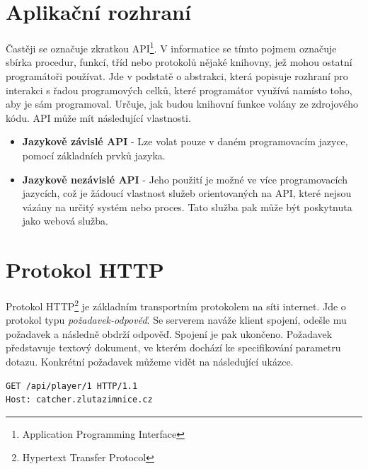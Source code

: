 
\section{Aplikační rozhraní}

Častěji se označuje zkratkou API\footnote{Application Programming Interface}.
V informatice se tímto pojmem označuje sbírka procedur, funkcí, tříd
nebo protokolů nějaké knihovny, jež mohou ostatní programátoři používat.
Jde v podstatě o abstrakci, která popisuje rozhraní pro interakci s řadou programových celků,
které programátor využívá namísto toho, aby je sám programoval.
Určuje, jak budou knihovní funkce volány ze zdrojového kódu. API může mít následující vlastnosti.

\begin{itemize}
  \item \textbf{Jazykově závislé API} - Lze volat pouze v daném programovacím jazyce, pomocí základních prvků jazyka.
  \item \textbf{Jazykově nezávislé API} - Jeho použití je možné ve více programovacích jazycích, což je žádoucí vlastnost
    služeb orientovaných na API, které nejsou vázány na určitý systém nebo proces.
    Tato služba pak může být poskytnuta jako webová služba.
\end{itemize}

\section{Protokol HTTP}


Protokol HTTP\footnote{Hypertext Transfer Protocol} je základním transportním protokolem na síti internet.
Jde o protokol typu \textit{požadavek-odpověď}. Se serverem naváže klient spojení,
odešle mu požadavek a následně obdrží odpověď. Spojení je pak ukončeno.
Požadavek představuje textový dokument, ve kterém dochází ke specifikování parametru dotazu.
Konkrétní požadavek můžeme vidět na následující ukázce.

\begingroup
\fontsize{9.5pt}{11pt}\selectfont
\begin{verbatim}
GET /api/player/1 HTTP/1.1
Host: catcher.zlutazimnice.cz
\end{verbatim}
\endgroup

